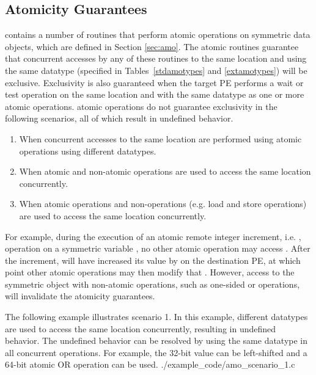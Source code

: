 \subsection{Atomicity Guarantees}\label{subsec:amo_guarantees}

\openshmem contains a number of routines that perform atomic operations on
symmetric data objects, which are defined in Section \ref{sec:amo}.
The atomic routines
guarantee that concurrent accesses by any of these routines to the same
location and using the same datatype (specified in Tables~\ref{stdamotypes} and
\ref{extamotypes}) will be exclusive.
Exclusivity is also guaranteed when the target \ac{PE} performs a wait or test
operation on the same location and with the same datatype as one or more atomic
operations.
\openshmem atomic operations do not guarantee exclusivity in the following
scenarios, all of which result in undefined behavior.
\begin{enumerate}
    \item When concurrent accesses to the same location are performed using
        \openshmem atomic operations using different datatypes.
    \item When atomic and non-atomic \openshmem operations are used to access
        the same location concurrently.
    \item When \openshmem atomic operations and non-\openshmem operations (e.g.
        load and store operations) are used to access the same location
        concurrently.
\end{enumerate}
For example, during the execution of an atomic remote integer increment, i.e. ,
operation on a symmetric variable , no other \openshmem atomic operation
may access .  After the increment,  will have increased its value
by  on the destination \ac{PE}, at which point other atomic operations
may then modify that .  However, access to the symmetric object 
with non-atomic operations, such as one-sided  or  operations,
will invalidate the atomicity guarantees.

\cexample
    {The following \CorCpp example illustrates scenario 1.  In this example,
    different datatypes are used to access the same location concurrently,
    resulting in undefined behavior.  The undefined behavior can be resolved by
    using the same datatype in all concurrent operations.  For example, the
    32-bit value can be left-shifted and a 64-bit atomic OR operation can be
    used.}
    {./example_code/amo_scenario_1.c}

